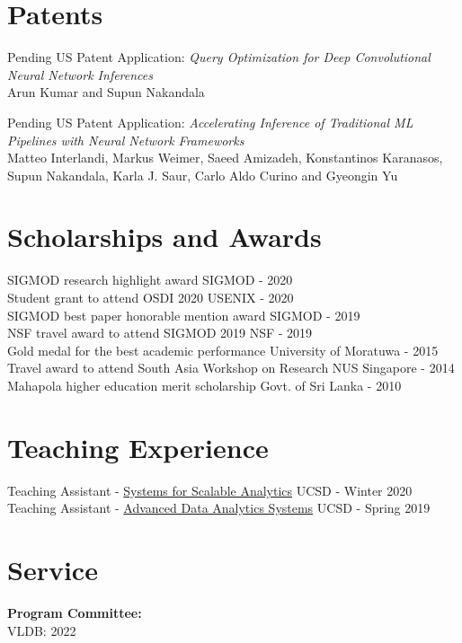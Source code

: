 \documentclass[margin]{res}
\begin{document}
\begin{resume}
\section{Patents}
\par
Pending US Patent Application: \textit{Query Optimization for Deep Convolutional Neural Network Inferences}\\
Arun Kumar and Supun Nakandala

\par
Pending US Patent Application: \textit{Accelerating Inference of Traditional ML Pipelines with Neural Network Frameworks}\\
Matteo Interlandi, Markus Weimer, Saeed Amizadeh, Konstantinos Karanasos,
Supun Nakandala, Karla J. Saur, Carlo Aldo Curino and Gyeongin Yu


\section{Scholarships and Awards}
SIGMOD research highlight award \hfill SIGMOD - 2020\\
Student grant to attend OSDI 2020 \hfill USENIX - 2020\\
SIGMOD best paper honorable mention award \hfill SIGMOD - 2019\\
NSF travel award to attend SIGMOD 2019 \hfill NSF - 2019\\
Gold medal for the best academic performance \hfill University of Moratuwa - 2015\\
Travel award to attend South Asia Workshop on Research \hfill NUS Singapore - 2014\\
Mahapola higher education merit scholarship \hfill Govt. of Sri Lanka - 2010


\section{Teaching Experience}
Teaching Assistant - \href{http://cseweb.ucsd.edu/~arunkk/dsc102_winter20}{Systems for Scalable Analytics} \hfill UCSD - Winter 2020\\
Teaching Assistant - \href{http://cseweb.ucsd.edu/classes/wi19/cse291-f}{Advanced Data Analytics Systems} \hfill UCSD - Spring 2019


\section{Service}
\textbf{Program Committee:}\\
VLDB: 2022


\end{resume}
\end{document}
